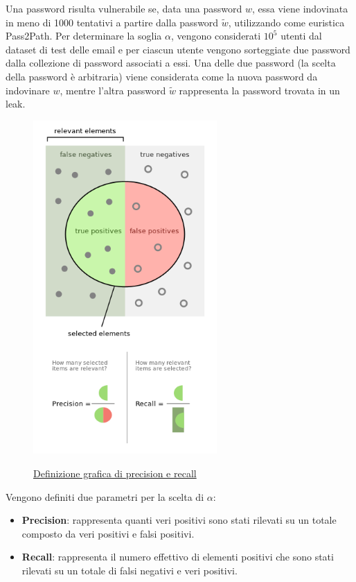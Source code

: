 Una password risulta vulnerabile se, data una password $w$, essa viene indovinata in meno di 1000 tentativi a partire dalla password $\tilde{w}$, utilizzando come euristica Pass2Path.
Per determinare la soglia $\alpha$, vengono considerati $10^5$ utenti dal dataset di test delle email e per ciascun utente vengono sorteggiate due password dalla collezione di password associati a essi. Una delle due password (la scelta della password è arbitraria) viene considerata come la nuova password da indovinare $w$, mentre l'altra password $\tilde{w}$ rappresenta la password trovata in un leak. 
\begin{figure}[h!]
    \centering
    \includegraphics[width=7cm]{./immagini/precisionrecall.png}
    \label{precision recall}
    \caption{\href{https://upload.wikimedia.org/wikipedia/commons/2/26/Precisionrecall.svg}{Definizione grafica di precision e recall}}
\end{figure}
\FloatBarrier
Vengono definiti due parametri per la scelta di $\alpha$:
\begin{itemize}
    \item \textbf{Precision}: rappresenta quanti veri positivi sono stati rilevati su un totale composto da veri positivi e falsi positivi.    
    \item \textbf{Recall}: rappresenta il numero effettivo di elementi positivi che sono stati rilevati su un totale di falsi negativi e veri positivi.
\end{itemize}
